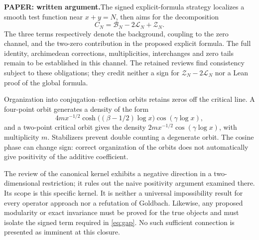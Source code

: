 \documentclass[11pt,a4paper]{article}
\theoremstyle{remark}
\newcommand{\paper}{\textbf{PAPER: written argument.}\space}
\begin{document}
\paper The signed explicit-formula strategy localizes a smooth test
function near $x+y=N$, then aims for the decomposition
\[
C_N=\mathcal B_N-2\mathcal L_N+\mathcal Z_N.
\]
The three terms respectively denote the background, coupling to the
zero channel, and the two-zero contribution in the proposed explicit formula.
The full identity, archimedean corrections, multiplicities,
interchanges and zero tails remain to be established in this channel.
The retained reviews find consistency subject to these obligations; they
credit neither a sign for $\mathcal Z_N-2\mathcal L_N$ nor a
Lean proof of the global formula.

Organization into conjugation--reflection orbits retains zeros off
the critical line. A four-point orbit generates a density
of the form
\[
4m x^{-1/2}\cosh\bigl((\beta-1/2)\log x\bigr)
\cos(\gamma\log x),
\]
and a two-point critical orbit gives the density
$2m x^{-1/2}\cos(\gamma\log x)$, with multiplicity $m$.
Stabilizers prevent double counting a degenerate orbit.
The cosine phase can change sign: correct organization of the
orbits does not automatically give positivity of the additive coefficient.

The review of the canonical kernel exhibits a negative direction in a
two-dimensional restriction; it rules out the naive positivity argument
examined there. Its scope is this specific kernel. It is neither a
universal impossibility result for every operator approach nor a
refutation of Goldbach. Likewise, any proposed modularity or exact
invariance must be proved for the true objects and must
isolate the signed term required in \eqref{eq:gap}. No such
sufficient connection is presented as imminent at this closure.

\clearpage
\end{document}
